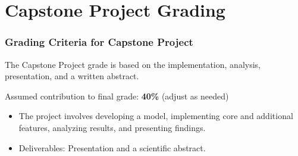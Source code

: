 \documentclass{beamer}
\begin{document}


\section{Capstone Project Grading}

\begin{frame}[t]
\frametitle{Grading Criteria for Capstone Project}
The Capstone Project grade is based on the implementation, analysis, presentation, and a written abstract.
\vspace{1em}

Assumed contribution to final grade: \textbf{40\%} (adjust as needed)
\vspace{1em}

\begin{itemize}
    \item The project involves developing a model, implementing core and additional features, analyzing results, and presenting findings.
    \item Deliverables: Presentation and a scientific abstract.
\end{itemize}
\end{frame}

\end{document}
